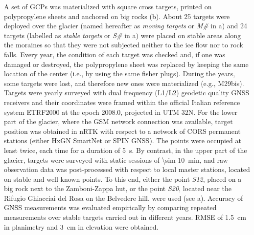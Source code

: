 A set of GCPs was materialized with square cross targets, printed on polypropylene sheets
and anchored on big rocks (b).
About 25 targets were deployed over the glacier (named hereafter as \textit{moving targets} or \textit{M\#} in a) and 24 targets (labelled as 
\textit{stable targets} or \textit{S\#} in a) were placed on
stable areas along the moraines so that they were not subjected neither to the ice flow
nor to rock falls.
Every year, the condition of each target was checked and, if one was damaged or
destroyed, the polypropylene sheet was replaced by keeping the same location of the
center (i.e., by using the same fisher plugs).
During the years, some targets were lost, and therefore new ones were materialized (e.g.,
M29bis).
Targets were yearly surveyed with dual frequency (L1/L2) geodetic quality GNSS receivers
and their coordinates were framed within the official Italian reference system ETRF2000
at the epoch 2008.0, projected in UTM 32N.
For the lower part of the glacier, where the GSM network connection was available, target
position was obtained in nRTK with respect to a network of CORS permanent stations
(either HxGN SmartNet or SPIN GNSS).
The points were occupied at least twice, each time for a duration of \qty{5}{\second}.
By contrast, in the upper part of the glacier, targets were surveyed with static sessions
of \qty{\sim 10}{\minute}, and raw observation data was post-processed with respect to
local master stations, located on stable and well known points.
To this end, either the point \textit{S12}, placed on a big rock next to the
Zamboni-Zappa hut, or the point \textit{S20}, located near the Rifugio Ghiacciai del Rosa
on the Belvedere hill,	were used (see a).
Accuracy of GNSS measurements was evaluated empirically by comparing repeated
measurements over stable targets carried out in different years.
RMSE of \qty{1.5}{\centi\meter} in planimetry and \qty{3}{\centi\meter} in elevation were
obtained.

